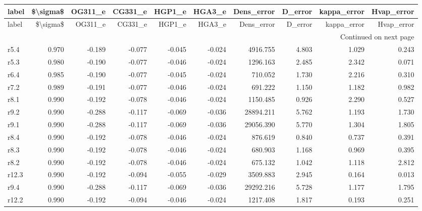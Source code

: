 \begin{longtable}{lrrrrrrrrr}
\toprule
label &  \$\textbackslash sigma\$ &  OG311\_e &  CG331\_e &  HGP1\_e &  HGA3\_e &  Dens\_error &  D\_error &  kappa\_error &  Hvap\_error \\
\midrule
\endfirsthead

\toprule
label &  \$\textbackslash sigma\$ &  OG311\_e &  CG331\_e &  HGP1\_e &  HGA3\_e &  Dens\_error &  D\_error &  kappa\_error &  Hvap\_error \\
\midrule
\endhead
\midrule
\multicolumn{10}{r}{{Continued on next page}} \\
\midrule
\endfoot

\bottomrule
\endlastfoot
 r5.4 &     0.970 &   -0.189 &   -0.077 &  -0.045 &  -0.024 &    4916.755 &    4.803 &        1.029 &       0.243 \\
 r5.3 &     0.980 &   -0.190 &   -0.077 &  -0.046 &  -0.024 &    1296.163 &    2.485 &        2.342 &       0.071 \\
 r6.4 &     0.985 &   -0.190 &   -0.077 &  -0.045 &  -0.024 &     710.052 &    1.730 &        2.216 &       0.310 \\
 r7.2 &     0.989 &   -0.191 &   -0.077 &  -0.046 &  -0.024 &     691.222 &    1.150 &        1.182 &       0.982 \\
 r8.1 &     0.990 &   -0.192 &   -0.078 &  -0.046 &  -0.024 &    1150.485 &    0.926 &        2.290 &       0.527 \\
 r9.2 &     0.990 &   -0.288 &   -0.117 &  -0.069 &  -0.036 &   28894.211 &    5.762 &        1.193 &       1.730 \\
 r9.1 &     0.990 &   -0.288 &   -0.117 &  -0.069 &  -0.036 &   29056.390 &    5.770 &        1.304 &       1.805 \\
 r8.4 &     0.990 &   -0.192 &   -0.078 &  -0.046 &  -0.024 &     876.619 &    0.840 &        0.737 &       0.391 \\
 r8.3 &     0.990 &   -0.192 &   -0.078 &  -0.046 &  -0.024 &     680.903 &    1.168 &        0.969 &       0.395 \\
 r8.2 &     0.990 &   -0.192 &   -0.078 &  -0.046 &  -0.024 &     675.132 &    1.042 &        1.118 &       2.812 \\
r12.3 &     0.990 &   -0.192 &   -0.094 &  -0.055 &  -0.029 &    3509.883 &    2.945 &        0.164 &       0.013 \\
 r9.4 &     0.990 &   -0.288 &   -0.117 &  -0.069 &  -0.036 &   29292.216 &    5.728 &        1.177 &       1.795 \\
r12.2 &     0.990 &   -0.192 &   -0.094 &  -0.046 &  -0.024 &    1217.408 &    1.817 &        0.193 &       0.251 \\

\end{longtable}
